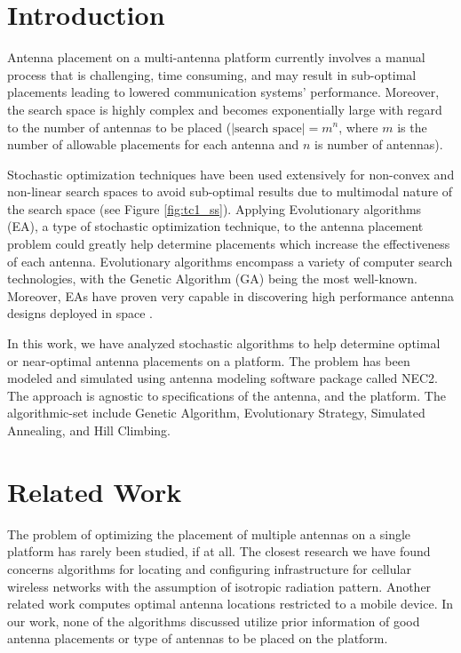 \documentclass[conference]{IEEEtran}
\begin{document}
\section{Introduction}
Antenna placement on a multi-antenna platform currently involves a manual process that is challenging, time consuming, and may result in sub-optimal placements leading to lowered communication systems' performance. Moreover, the search space is highly complex and becomes exponentially large with regard to the number of antennas to be placed ($|\text{search space}| = m^n$, where $m$ is the number of allowable placements for each antenna and $n$ is number of antennas). 

Stochastic optimization techniques have been used extensively for non-convex and non-linear search spaces to avoid sub-optimal results due to multimodal nature of the search space (see Figure \ref{fig:tc1_ss}). Applying Evolutionary algorithms (EA), a type of stochastic optimization technique, to the antenna placement problem could greatly help determine placements which increase the effectiveness of each antenna. Evolutionary algorithms encompass a variety of computer search technologies, with the Genetic Algorithm (GA) being the most well-known. Moreover, EAs have proven very capable in discovering high performance antenna designs deployed in space \cite{lohn2005evolutionary}. 

In this work, we have analyzed stochastic algorithms to help determine optimal or near-optimal antenna placements on a platform. The problem has been modeled and simulated using antenna modeling software package called NEC2. The approach is agnostic to specifications of the antenna, and the platform. The algorithmic-set include Genetic Algorithm, Evolutionary Strategy, Simulated Annealing, and Hill Climbing.

\section{Related Work}
\label{sec:related}
The problem of optimizing the placement of multiple antennas on a single platform has rarely been studied, if at all.  The closest research we have found concerns algorithms for locating and configuring infrastructure for cellular wireless networks with the assumption of isotropic radiation pattern. Another related work computes optimal antenna locations restricted to a mobile device. In our work, none of the algorithms discussed utilize prior information of good antenna placements or type of antennas to be placed on the platform.
\end{document}
